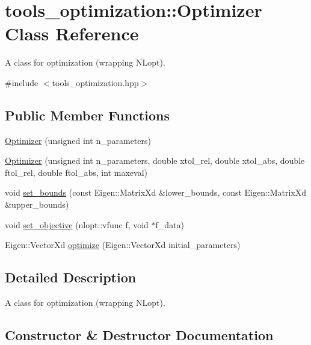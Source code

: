 \hypertarget{classtools__optimization_1_1_optimizer}{}\section{tools\+\_\+optimization\+:\+:Optimizer Class Reference}
\label{classtools__optimization_1_1_optimizer}


A class for optimization (wrapping N\+Lopt).  




{\ttfamily \#include $<$tools\+\_\+optimization.\+hpp$>$}

\subsection*{Public Member Functions}
\begin{DoxyCompactItemize}
\item 
\hyperlink{classtools__optimization_1_1_optimizer_ad942cc446b8521f23188609e5bcc5997}{Optimizer} (unsigned int n\+\_\+parameters)
\item 
\hyperlink{classtools__optimization_1_1_optimizer_ad8188b4e87bc3922785eded421dae611}{Optimizer} (unsigned int n\+\_\+parameters, double xtol\+\_\+rel, double xtol\+\_\+abs, double ftol\+\_\+rel, double ftol\+\_\+abs, int maxeval)
\item 
void \hyperlink{classtools__optimization_1_1_optimizer_ab2993e639db413bbb0e85ee53cacf912}{set\+\_\+bounds} (const Eigen\+::\+Matrix\+Xd \&lower\+\_\+bounds, const Eigen\+::\+Matrix\+Xd \&upper\+\_\+bounds)
\item 
void \hyperlink{classtools__optimization_1_1_optimizer_a73263635411685f915e7e390454ba12e}{set\+\_\+objective} (nlopt\+::vfunc f, void $\ast$f\+\_\+data)
\item 
Eigen\+::\+Vector\+Xd \hyperlink{classtools__optimization_1_1_optimizer_aebe310592043a99931f7999753a65577}{optimize} (Eigen\+::\+Vector\+Xd initial\+\_\+parameters)
\end{DoxyCompactItemize}


\subsection{Detailed Description}
A class for optimization (wrapping N\+Lopt). 

\subsection{Constructor \& Destructor Documentation}
